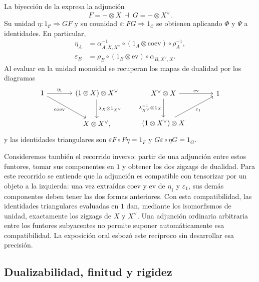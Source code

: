 La biyección de la  expresa la adjunción
\[
F=-\otimes X\ \dashv\ G=-\otimes X^\vee.
\]
Su unidad $\eta\colon1_{\mathcal C}\Rightarrow GF$ y su counidad $\varepsilon\colon FG\Rightarrow1_{\mathcal C}$ se obtienen aplicando $\Phi$ y $\Psi$ a identidades. En particular,
\[
\begin{aligned}
\eta_A&=\alpha^{-1}_{A,X,X^\vee}\circ(1_A\otimes\mathrm{coev})\circ\rho_A^{-1},\\
\varepsilon_B&=\rho_B\circ(1_B\otimes\mathrm{ev})\circ\alpha_{B,X^\vee,X}.
\end{aligned}
\]
Al evaluar en la unidad monoidal se recuperan los mapas de dualidad por los diagramas
\[
\begin{tikzcd}[column sep=large,row sep=large]
1 \arrow[r,"\eta_1"] \arrow[dr,"\mathrm{coev}"'] & (1\otimes X)\otimes X^\vee \arrow[d,"\lambda_X\otimes1_{X^\vee}"]\\
& X\otimes X^\vee,
\end{tikzcd}
\qquad
\begin{tikzcd}[column sep=large,row sep=large]
X^\vee\otimes X \arrow[r,"\mathrm{ev}"] \arrow[d,"\lambda_{X^\vee}^{-1}\otimes1_X"'] & 1\\
(1\otimes X^\vee)\otimes X \arrow[ur,"\varepsilon_1"'] &
\end{tikzcd}
\]
y las identidades triangulares son $\varepsilon F\circ F\eta=1_F$ y $G\varepsilon\circ\eta G=1_G$.

\begin{nota}\label{nota:compatibilidad-adjuncion-dual}
Consideremos también el recorrido inverso: partir de una adjunción entre estos funtores, tomar sus componentes en $1$ y obtener los dos zigzags de dualidad. Para este recorrido se entiende que la adjunción es compatible con tensorizar por un objeto a la izquierda: una vez extraídas $\mathrm{coev}$ y $\mathrm{ev}$ de $\eta_1$ y $\varepsilon_1$, sus demás componentes deben tener las dos formas anteriores. Con esta compatibilidad, las identidades triangulares evaluadas en $1$ dan, mediante los isomorfismos de unidad, exactamente los zigzags de $X$ y $X^\vee$. Una adjunción ordinaria arbitraria entre los funtores subyacentes no permite suponer automáticamente esa compatibilidad. La exposición oral esbozó este recíproco sin desarrollar esa precisión.
\end{nota}

\subsection{Dualizabilidad, finitud y rigidez}

